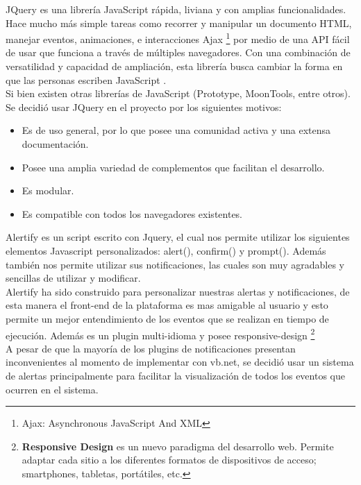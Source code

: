 JQuery es una librería JavaScript rápida, liviana y con amplias funcionalidades. Hace mucho más simple tareas como recorrer y manipular un documento HTML, manejar eventos, animaciones, e interacciones Ajax	\footnote{Ajax: Asynchronous JavaScript And XML} por medio de una API fácil de usar que funciona a través de múltiples navegadores. Con una combinación de versatilidad y capacidad de ampliación, esta librería busca cambiar la forma en que las personas escriben JavaScript \cite{JQu15}.
\\

Si bien existen otras librerías de JavaScript (Prototype, MoonTools, entre otros). Se decidió usar JQuery en el proyecto por los siguientes motivos:
\begin{itemize}
	\item Es de uso general, por lo que posee una comunidad activa y una extensa documentación.
	\item Posee una amplia variedad de complementos que facilitan el desarrollo.
	\item Es modular.
	\item Es compatible con todos los navegadores existentes.
\end{itemize}



Alertify es un script escrito con Jquery, el cual nos permite utilizar los siguientes elementos Javascript personalizados: alert(), confirm() y prompt(). Además también nos permite utilizar sus notificaciones, las cuales son muy agradables y sencillas de utilizar y modificar\cite{ALE15}.
\\

Alertify ha sido construido para personalizar nuestras alertas y notificaciones, de esta manera el front-end de la plataforma es mas amigable al usuario y esto permite un mejor entendimiento de los eventos que se realizan en tiempo de ejecución. Además es un plugin multi-idioma y posee responsive-design \footnote{ \textbf{ Responsive Design} es un nuevo paradigma del desarrollo web. Permite adaptar cada sitio a los diferentes formatos de dispositivos de acceso; smartphones, tabletas, portátiles, etc.}
\\

A pesar de que la mayoría de los plugins de notificaciones presentan inconvenientes al momento de implementar con vb.net, se decidió usar un sistema de alertas principalmente para facilitar la visualización de todos los eventos que ocurren en el sistema.


